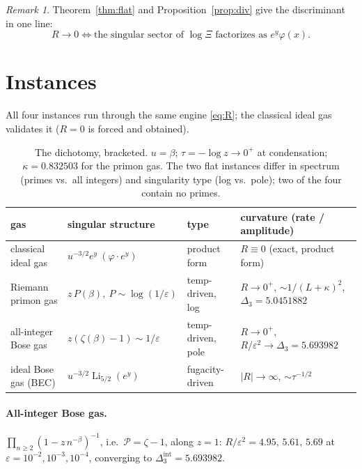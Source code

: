 \documentclass[a4paper,11pt]{article}
\theoremstyle{plain}
\theoremstyle{definition}
\theoremstyle{remark}
\newtheorem{remark}{Remark}
\newcommand{\Ric}{R}
\newcommand{\Li}{\operatorname{Li}}
\newcommand{\eps}{\varepsilon}
\begin{document}
\begin{remark}\label{rem:criterion}
Theorem~\ref{thm:flat} and Proposition~\ref{prop:div} give the discriminant in one line:
\[
   \boxed{\ \Ric\to0 \iff \text{the singular sector of }\log\Xi\text{ factorizes as } e^{y}\varphi(x).\ }
\]
\end{remark}

\section{Instances}\label{sec:instances}
All four instances run through the same engine \eqref{eq:R}; the classical ideal gas validates it
($\Ric=0$ is forced and obtained).

\begin{table}[h]
\centering
\begin{tabular}{@{}llll@{}}
\toprule
gas & singular structure & type & curvature (rate / amplitude)\\
\midrule
classical ideal gas        & $u^{-3/2}e^{y}\ (\varphi\cdot e^{y})$ & product form     & $\Ric\equiv0$ (exact, product form)\\
Riemann primon gas         & $z\,P(\beta),\ P\sim\log(1/\eps)$    & temp-driven, log & $\Ric\to0^{+}$, $\sim1/(L+\kappa)^2$, $\Delta_3=5.0451882$\\
all-integer Bose gas       & $z(\zeta(\beta)-1)\sim1/\eps$        & temp-driven, pole& $\Ric\to0^{+}$, $\Ric/\eps^2\to\Delta_3=5.693982$\\
ideal Bose gas (BEC)       & $u^{-3/2}\Li_{5/2}(e^{y})$           & fugacity-driven  & $|\Ric|\to\infty$, $\sim\tau^{-1/2}$\\
\bottomrule
\end{tabular}
\caption{The dichotomy, bracketed. $u=\beta$; $\tau=-\log z\to0^{+}$ at condensation;
$\kappa=0.832503$ for the primon gas. The two flat instances differ in spectrum (primes vs.\ all
integers) and singularity type (log vs.\ pole); two of the four contain no primes.}
\label{tab:instances}
\end{table}

\paragraph{All-integer Bose gas.} $\prod_{n\ge2}(1-z\,n^{-\beta})^{-1}$, i.e.\ $\mathcal P=\zeta-1$,
along $z=1$: $\Ric/\eps^2 = 4.95,\,5.61,\,5.69$ at $\eps=10^{-2},10^{-3},10^{-4}$, converging to
$\Delta_3^{\mathrm{int}}=5.693982$.
\end{document}
